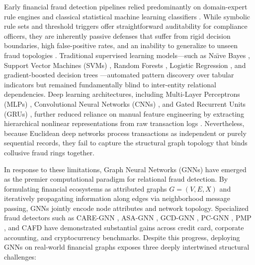 \documentclass[10pt,a4paper,twocolumn]{article}
\begin{document}
Early financial fraud detection pipelines relied predominantly on domain-expert rule engines \cite{ref4} and classical statistical machine learning classifiers \cite{ref5}. While symbolic rule sets and threshold triggers offer straightforward auditability for compliance officers, they are inherently passive defenses that suffer from rigid decision boundaries, high false-positive rates, and an inability to generalize to unseen fraud topologies \cite{ref15,ref16}. Traditional supervised learning models---such as Na\"{\i}ve Bayes \cite{ref19}, Support Vector Machines (SVMs) \cite{ref20,ref22}, Random Forests \cite{ref21}, Logistic Regression \cite{ref23}, and gradient-boosted decision trees \cite{ref39}---automated pattern discovery over tabular indicators but remained fundamentally blind to inter-entity relational dependencies. Deep learning architectures, including Multi-Layer Perceptrons (MLPs) \cite{ref24}, Convolutional Neural Networks (CNNs) \cite{ref25,ref26}, and Gated Recurrent Units (GRUs) \cite{ref27}, further reduced reliance on manual feature engineering by extracting hierarchical nonlinear representations from raw transaction logs \cite{ref6}. Nevertheless, because Euclidean deep networks process transactions as independent or purely sequential records, they fail to capture the structural graph topology that binds collusive fraud rings together.

In response to these limitations, Graph Neural Networks (GNNs) \cite{ref7} have emerged as the premier computational paradigm for relational fraud detection. By formulating financial ecosystems as attributed graphs $G = (V, E, X)$ and iteratively propagating information along edges via neighborhood message passing, GNNs jointly encode node attributes and network topology. Specialized fraud detectors such as CARE-GNN \cite{ref8}, ASA-GNN \cite{ref10}, GCD-GNN \cite{ref11}, PC-GNN \cite{ref48}, PMP \cite{ref49}, and CAFD \cite{ref12} have demonstrated substantial gains across credit card, corporate accounting, and cryptocurrency benchmarks. Despite this progress, deploying GNNs on real-world financial graphs exposes three deeply intertwined structural challenges:
\end{document}
